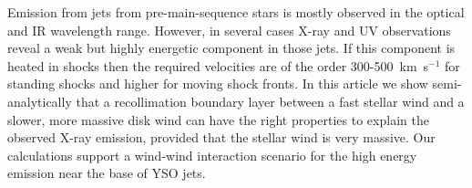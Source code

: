 Emission from jets from pre-main-sequence stars is mostly observed in the optical and IR wavelength range. However, in several cases X-ray and UV observations reveal a weak but highly energetic component in those jets. If this component is heated in shocks then the required velocities are of the order 300-500~km~s$^{-1}$ for standing shocks and higher for moving shock fronts. In this article we show semi-analytically that a recollimation boundary layer between a fast stellar wind and a slower, more massive disk wind can have the right properties to explain the observed X-ray emission, provided that the stellar wind is very massive. Our calculations support a wind-wind interaction scenario for the high energy emission near the base of YSO jets. 
